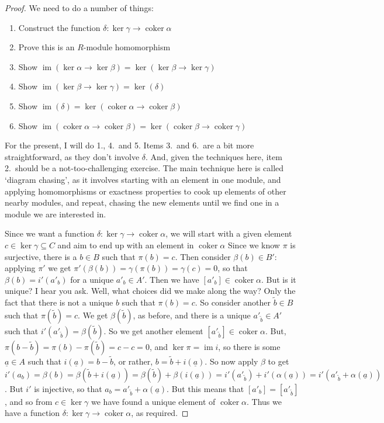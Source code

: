 \documentclass{tufte-handout}
\DeclareMathOperator{\coker}{coker}
\DeclareMathOperator{\im}{im}
\theoremstyle{definition}
\begin{document}
\begin{proof}
We need to do a number of things:
\begin{enumerate}
\item Construct the function $\delta \colon \ker\gamma \to \coker\alpha$
\item Prove this is an $R$-module homomorphism
\item Show $\im(\ker\alpha \to \ker\beta) = \ker(\ker\beta \to \ker\gamma)$
\item Show $\im(\ker\beta \to \ker\gamma) = \ker(\delta)$
\item Show $\im(\delta) = \ker(\coker\alpha \to \coker\beta)$
\item Show $\im(\coker\alpha \to \coker\beta) = \ker(\coker\beta \to \coker\gamma)$
\end{enumerate}

For the present, I will do 1., 4.\ and 5. Items 3.\ and 6.\ are a bit more 
straightforward, as they don't involve $\delta$. And, given the techniques here, item 
2.\ should be a not-too-challenging exercise. The main technique here is called `diagram 
chasing', as it involves starting with an element in one module, and applying 
homomorphisms or exactness properties to cook up elements of other nearby modules, and 
repeat, chasing the new elements until we find one in a module we are interested in. 

Since we want a function $\delta\colon \ker\gamma \to \coker\alpha$, we will start with 
a given element $c\in \ker\gamma \subseteq C$ and aim to end up with an element in 
$\coker\alpha$ Since we know $\pi$ is surjective, there is a $b\in B$ such that $\pi(b) 
= c$. Then consider $\beta(b) \in B'$: applying $\pi'$ we get $\pi'(\beta(b)) = 
\gamma(\pi(b)) = \gamma(c)=0$, so that $\beta(b) = i'(a'_b)$ for a unique $a'_b \in A'$. 
Then we have $[a'_b] \in \coker\alpha$. But is it unique? I hear you ask. Well, what 
choices did we make along the way? Only the fact that there is not a unique $b$ such 
that $\pi(b)=c$. So consider another $\tilde b \in B$ such that $\pi(\tilde b) = c$. We 
get $\beta(\tilde b)$, as before, and there is a unique $a'_{\tilde b} \in A'$ such that 
$i'(a'_{\tilde b}) = \beta(\tilde b)$. So we get another element $[a'_{\tilde b}]\in 
\coker\alpha$. But, $\pi(b - \tilde b)= \pi(b) - \pi(\tilde b) = c -c = 0$, and 
$\ker\pi=\im i$, so there is some $\underline{a}\in A$ such that $i(\underline{a}) = b - 
\tilde b$, or rather, $b = \tilde b + i(\underline{a})$. So now apply $\beta$ to get 
$i'(a_b) = \beta(b) = \beta(\tilde b + i(\underline{a})) = \beta(\tilde b) + 
\beta(i(\underline{a})) = i'(a'_{\tilde b}) + i'(\alpha(\underline{a})) = i'(a'_{\tilde b} 
+ \alpha(\underline{a}))$. But $i'$ is injective, so that $a_b = a'_{\tilde b} + 
\alpha(\underline{a})$. But this means that $[a'_b] = [a'_{\tilde b}]$, and so from $c\in 
\ker\gamma$ we have found a unique element of $\coker\alpha$. Thus we have a function
$\delta\colon \ker\gamma \to \coker\alpha$, as required.




\end{proof}
\end{document}
